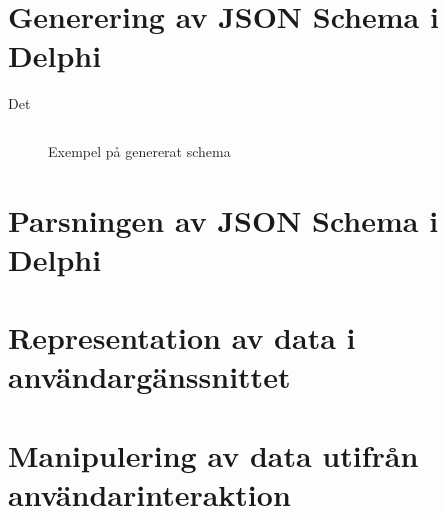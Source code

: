 \section{Generering av JSON Schema i Delphi}

Det 

\begin{figure}
	\inputminted[tabsize=2, frame=single, fontsize=\tiny, framesep=2mm, breaklines]{json}{code/schema.json}
	\vspace{-1.7em}
	\caption{Exempel på genererat schema}
	\label{fig:real-schema}
\end{figure}

\section{Parsningen av JSON Schema i Delphi}


\section{Representation av data i användargänssnittet}


\section{Manipulering av data utifrån användarinteraktion}
